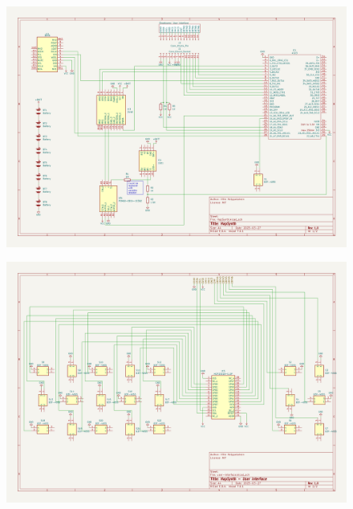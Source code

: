 \begin{figure}[h]
	\centering
	\includegraphics[width=0.8\linewidth]{figures/schematics-1.png}
\end{figure}

\begin{figure}[h]
	\centering
	\includegraphics[width=0.8\linewidth]{figures/schematics-2.png}
\end{figure}